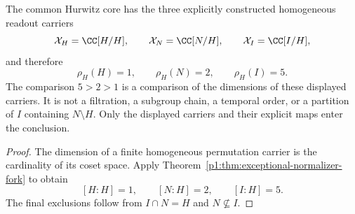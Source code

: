 \documentclass[11pt]{article}
\begin{document}
\begin{corollary}
\label{p1:cor:exceptional-aggregation-order}
The common Hurwitz core has the three explicitly constructed homogeneous
readout carriers
\[
    \mathcal X_H=\CC[H/H],
    \qquad
    \mathcal X_N=\CC[N/H],
    \qquad
    \mathcal X_I=\CC[I/H],
\]
and therefore
\begin{equation}
\label{p1:eq:explicit-exceptional-readout-ranks}
    \rho_H(H)=1,
    \qquad
    \rho_H(N)=2,
    \qquad
    \rho_H(I)=5.
\end{equation}
The comparison \(5>2>1\) is a comparison of the dimensions of these displayed
carriers.  It is not a filtration, a subgroup chain, a temporal order, or a
partition of \(I\) containing \(N\setminus H\).
Only the displayed carriers and their explicit maps enter the conclusion.
\end{corollary}

\begin{proof}
The dimension of a finite homogeneous permutation carrier is the cardinality
of its coset space.  Apply
Theorem~\ref{p1:thm:exceptional-normalizer-fork} to obtain
\[
    [H:H]=1,
    \qquad
    [N:H]=2,
    \qquad
    [I:H]=5.
\]
The final exclusions follow from \(I\cap N=H\) and \(N\nsubseteq I\).
\end{proof}
\end{document}

